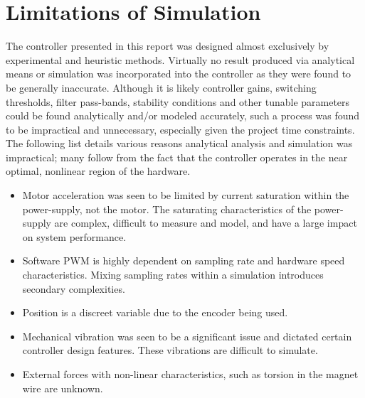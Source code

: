 \section{Limitations of Simulation}
\label{sec:SimulationLimitations}

The controller presented in this report was designed almost exclusively by experimental and heuristic methods.
Virtually no result produced via analytical means or simulation was incorporated into the controller as they were found to be generally inaccurate.
Although it is likely controller gains, switching thresholds, filter pass-bands, stability conditions and other tunable parameters could be found analytically and/or modeled accurately, such a process was found to be impractical and unnecessary, especially given the project time constraints. 
The following list details various reasons analytical analysis and simulation was impractical; many follow from the fact that the controller operates in the near optimal, nonlinear region of the hardware. 

\begin{itemize}
\item Motor acceleration was seen to be limited by current saturation within the power-supply, not the motor. The saturating characteristics of the power-supply are complex, difficult to measure and model, and have a large impact on system performance. 
\item Software PWM is highly dependent on sampling rate and hardware speed characteristics. Mixing sampling rates within a simulation introduces secondary complexities.
\item Position is a discreet variable due to the encoder being used.
\item Mechanical vibration was seen to be a significant issue and dictated certain controller design features. These vibrations are difficult to simulate.
\item External forces with non-linear characteristics, such as torsion in the magnet wire are unknown.
\end{itemize}
